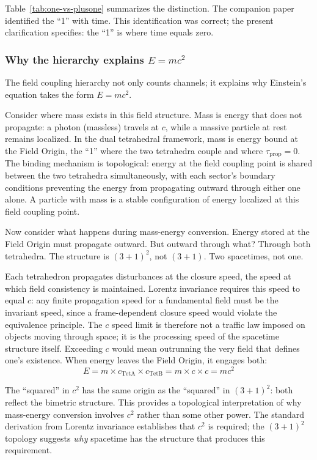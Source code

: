 \documentclass[aps,prd,preprint,superscriptaddress,showpacs,preprintnumbers,amsmath,amssymb,nofootinbib]{revtex4-2}
\begin{document}
Table~\ref{tab:one-vs-plusone} summarizes the distinction. The companion paper~\cite{paper6} identified the ``1'' with time. This identification was correct; the present clarification specifies: the ``1'' is where time equals zero.

\subsubsection*{Why the hierarchy explains $E = mc^2$}

The field coupling hierarchy not only counts channels; it explains why Einstein's equation takes the form $E = mc^2$.

Consider where mass exists in this field structure. Mass is energy that does not propagate: a photon (massless) travels at $c$, while a massive particle at rest remains localized. In the dual tetrahedral framework, mass is energy bound at the Field Origin, the ``1'' where the two tetrahedra couple and where $\tau_{\text{prop}} = 0$. The binding mechanism is topological: energy at the field coupling point is shared between the two tetrahedra simultaneously, with each sector's boundary conditions preventing the energy from propagating outward through either one alone. A particle with mass is a stable configuration of energy localized at this field coupling point.

Now consider what happens during mass-energy conversion. Energy stored at the Field Origin must propagate outward. But outward through what? Through both tetrahedra. The structure is $(3+1)^2$, not $(3+1)$. Two spacetimes, not one.

Each tetrahedron propagates disturbances at the closure speed, the speed at which field consistency is maintained. Lorentz invariance requires this speed to equal $c$: any finite propagation speed for a fundamental field must be the invariant speed, since a frame-dependent closure speed would violate the equivalence principle. The $c$ speed limit is therefore not a traffic law imposed on objects moving through space; it is the processing speed of the spacetime structure itself. Exceeding $c$ would mean outrunning the very field that defines one's existence. When energy leaves the Field Origin, it engages both:
\begin{equation}
E = m \times c_{\text{TetA}} \times c_{\text{TetB}} = m \times c \times c = mc^2
\end{equation}

The ``squared'' in $c^2$ has the same origin as the ``squared'' in $(3+1)^2$: both reflect the bimetric structure. This provides a topological interpretation of why mass-energy conversion involves $c^2$ rather than some other power. The standard derivation from Lorentz invariance establishes that $c^2$ is required; the $(3+1)^2$ topology suggests \emph{why} spacetime has the structure that produces this requirement.
\end{document}
